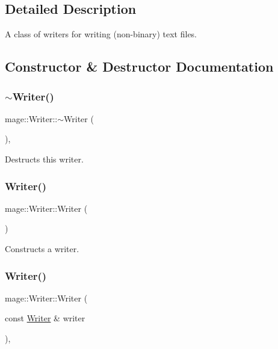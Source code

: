 \subsection{Detailed Description}
A class of writers for writing (non-\/binary) text files. 

\subsection{Constructor \& Destructor Documentation}
\hypertarget{classmage_1_1_writer_aeeb30d6afb1a271b4ad294889054caec}{}\label{classmage_1_1_writer_aeeb30d6afb1a271b4ad294889054caec} 
\subsubsection{\texorpdfstring{$\sim$\+Writer()}{~Writer()}}
{\footnotesize\ttfamily mage\+::\+Writer\+::$\sim$\+Writer (\begin{DoxyParamCaption}{ }\end{DoxyParamCaption})\hspace{0.3cm}{\ttfamily [virtual]}, {\ttfamily [default]}}

Destructs this writer. \hypertarget{classmage_1_1_writer_a40b6cd3005d509e670c5a49272d9ef27}{}\label{classmage_1_1_writer_a40b6cd3005d509e670c5a49272d9ef27} 
\subsubsection{\texorpdfstring{Writer()}{Writer()}\hspace{0.1cm}{\footnotesize\ttfamily [1/3]}}
{\footnotesize\ttfamily mage\+::\+Writer\+::\+Writer (\begin{DoxyParamCaption}{ }\end{DoxyParamCaption})\hspace{0.3cm}{\ttfamily [protected]}}

Constructs a writer. \hypertarget{classmage_1_1_writer_a2b257938508732ca0b78241aafa7922c}{}\label{classmage_1_1_writer_a2b257938508732ca0b78241aafa7922c} 
\subsubsection{\texorpdfstring{Writer()}{Writer()}\hspace{0.1cm}{\footnotesize\ttfamily [2/3]}}
{\footnotesize\ttfamily mage\+::\+Writer\+::\+Writer (\begin{DoxyParamCaption}\item[{const \hyperlink{classmage_1_1_writer}{Writer} \&}]{writer }\end{DoxyParamCaption})\hspace{0.3cm}{\ttfamily [protected]}, {\ttfamily [delete]}}

